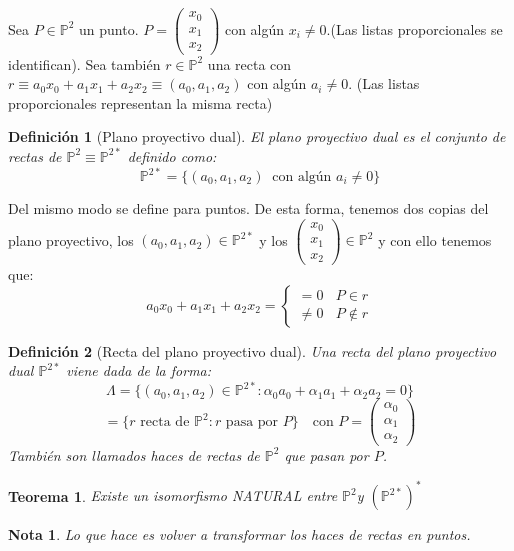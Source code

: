 \documentclass[11pt, a4paper]{article}
\newif\IfInSansMode
\theoremstyle{theorem-style}
\newtheorem{nth}{Teorema}[section]
\theoremstyle{definition-style}
\newtheorem{ndef}{Definición}[section]
\theoremstyle{remark-style}
\newtheorem*{nota}{Nota}
\theoremstyle{example-style}
\begin{document}
	Sea $P \in \mathbb P ^2$ un punto. $P = \begin{pmatrix}
 x_0\\
 x_1\\
 x_2
\end{pmatrix} $ con algún $x_i \ne 0$.(Las listas proporcionales se identifican). 
Sea también $r \in \mathbb P ^2$ una recta con $r \equiv a_0x_0 + a_1x_1 + a_2 x_2 \equiv (a_0,a_1,a_2)$  con algún $a_i \ne 0$. (Las listas proporcionales representan la misma recta)



\begin{ndef}[Plano proyectivo dual]
	El plano proyectivo dual es el conjunto de rectas de $\mathbb P ^2 \equiv \mathbb P^{2*}$ definido como:
	\[
	\mathbb P^{2*} = \{ (a_0,a_1,a_2) \ \text{ con algún $a_i\ne 0$}\}
	\]
\end{ndef}
Del mismo modo se define para puntos. De esta forma, tenemos dos copias del plano proyectivo, los $(a_0,a_1,a_2)\in \mathbb P^{2*}$ y los $\begin{pmatrix}
 x_0\\
 x_1\\
 x_2
\end{pmatrix}  \in \mathbb P ^2$ y con ello tenemos que:
\[
a_0 x_0 + a_1x_1 + a_2x_2 = \begin{cases}
	=0 \ \ \ \ P \in r\\
	\ne 0 \ \ \ \ P \notin r
\end{cases}
\]

\begin{ndef}[Recta del plano proyectivo dual]
	Una recta del plano proyectivo dual $\mathbb P^{2*}$ viene dada de la forma:
	\[
	\Lambda = \{ (a_0, a_1,a_2) \in \mathbb P^{2*} : \alpha_0a_0 + \alpha_1 a_1 + \alpha_2 a_2 = 0\}
	\]
	\[
	= \{ r \text{ recta de } \mathbb P ^2  : r \text { pasa por } P\} \ \ \ \text{ con } P = \begin{pmatrix}
 \alpha_0\\
 \alpha_1\\
 \alpha_2
\end{pmatrix} 
	\]
	También son llamados haces de rectas de $\mathbb P^2$ que pasan por $P$.
\end{ndef}

\begin{nth}
	Existe un isomorfismo NATURAL entre $\mathbb P^2 $y $(\mathbb P^{2*})^*$
\end{nth}
\begin{nota}
	Lo que hace es volver a transformar los haces de rectas en puntos.
\end{nota}
\end{document}
